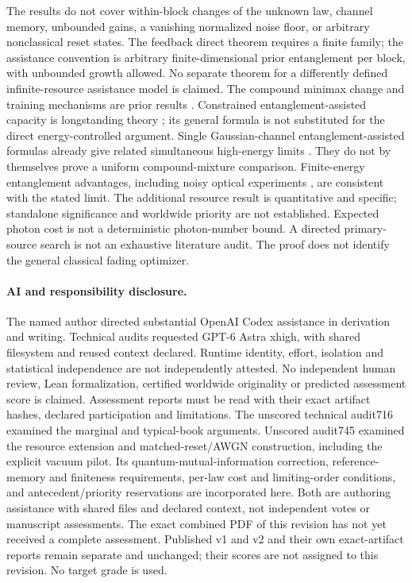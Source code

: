 \documentclass[11pt]{article}
\begin{document}
The results do not cover within-block changes of the unknown law,
channel memory, unbounded gains, a vanishing normalized noise floor,
or arbitrary nonclassical reset states. The feedback direct theorem
requires a finite family; the assistance convention is arbitrary
finite-dimensional prior entanglement per block, with unbounded growth
allowed. No separate theorem for a differently defined infinite-resource
assistance model is claimed.
The compound minimax change and training mechanisms are prior results
\cite{bertaEA,bocheEA,shraderFB}. Constrained entanglement-assisted
capacity is longstanding theory \cite{holevoConstrained}; its general
formula is not substituted for the direct energy-controlled argument.
Single Gaussian-channel entanglement-assisted formulas already give
related simultaneous high-energy limits \cite{shiEA}. They do not by
themselves prove a uniform compound-mixture comparison. Finite-energy
entanglement advantages, including noisy optical experiments
\cite{haoEA}, are consistent with the stated limit. The additional
resource result is quantitative and specific; standalone significance
and worldwide priority are not established.
Expected photon cost is not a deterministic photon-number bound.
A directed primary-source search is not an exhaustive literature audit.
The proof does not identify the general classical fading optimizer.

\paragraph{AI and responsibility disclosure.}
The named author directed substantial OpenAI Codex assistance in
derivation and writing. Technical audits requested GPT-6 Astra xhigh,
with shared filesystem and reused context declared.
Runtime identity, effort, isolation and statistical independence are
not independently attested. No independent human review, Lean
formalization, certified worldwide originality or predicted assessment
score is claimed. Assessment reports must be read with their exact
artifact hashes, declared participation and limitations. The unscored technical audit716 examined the marginal and typical-book
arguments. Unscored audit745 examined the resource extension and
matched-reset/AWGN construction, including the explicit vacuum pilot.
Its quantum-mutual-information correction, reference-memory and
finiteness requirements, per-law cost and limiting-order conditions,
and antecedent/priority reservations are incorporated here. Both are
authoring assistance with shared files and declared context, not
independent votes or manuscript assessments. The exact combined PDF of
this revision has not yet received a complete assessment. Published v1
and v2 and their own exact-artifact reports remain separate and unchanged;
their scores are not assigned to this revision. No target grade is used.
\end{document}
